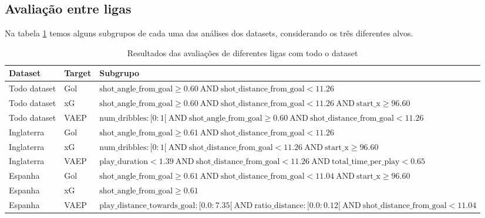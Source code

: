 \documentclass{article}
\begin{document}
\subsection{Avaliação entre ligas}

Na tabela \ref{tab:resultsSD} temos alguns subgrupos de cada uma das análises dos datasets, 
considerando os três diferentes alvos.

\begin{table}[H]
    \centering
    \begin{tabularx}{\textwidth}{|l|l|X|}
        \hline
        \textbf{Dataset} & \textbf{Target} & \textbf{Subgrupo} \\
        \hline
        Todo dataset & Gol & $ \text{shot\_angle\_from\_goal} \geq 0.60 \ \text{AND} \ \text{shot\_distance\_from\_goal} < 11.26 $ \\
        \hline
        Todo dataset & xG & $ \text{shot\_angle\_from\_goal} \geq 0.60 \ \text{AND} \ \text{shot\_distance\_from\_goal} < 11.26 \ \text{AND} \ \text{start\_x} \geq 96.60 $ \\
        \hline
        Todo dataset & VAEP & $ \text{num\_dribbles} : [0:1[ \ \text{AND} \ \text{shot\_angle\_from\_goal} \geq 0.60 \ \text{AND} \ \text{shot\_distance\_from\_goal} < 11.26 $ \\
        \hline
        Inglaterra & Gol & $ \text{shot\_angle\_from\_goal} \geq 0.61 \ \text{AND} \ \text{shot\_distance\_from\_goal} < 11.26 $ \\
        \hline
        Inglaterra & xG & $ \text{num\_dribbles} : [0:1[ \ \text{AND} \ \text{shot\_distance\_from\_goal} < 11.26 \ \text{AND} \ \text{start\_x} \geq 96.60 $ \\
        \hline
        Inglaterra & VAEP & $ \text{play\_duration} < 1.39 \ \text{AND} \ \text{shot\_distance\_from\_goal} < 11.26 \ \text{AND} \ \text{total\_time\_per\_play} < 0.65 $ \\
        \hline
        Espanha & Gol & $ \text{shot\_angle\_from\_goal} \geq 0.61 \ \text{AND} \ \text{shot\_distance\_from\_goal} < 11.04 \ \text{AND} \ \text{start\_x} \geq 96.60 $ \\
        \hline
        Espanha & xG & $ \text{shot\_angle\_from\_goal} \geq 0.61 $ \\
        \hline
        Espanha & VAEP & $ \text{play\_distance\_towards\_goal} : [0.0:7.35[ \ \text{AND} \ \text{ratio\_distance} : [0.0:0.12[ \ \text{AND} \ \text{shot\_distance\_from\_goal} < 11.04 $ \\
        \hline
    \end{tabularx}
    \caption{Resultados das avaliações de diferentes ligas com todo o dataset}
    \label{tab:resultsSD}
\end{table}
\end{document}
